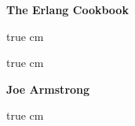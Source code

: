 \begin{titlepage}
\begin{center}
\vspace*{1.0cm}
{\Huge\bf 
The Erlang Cookbook\\
}

 true cm


 true cm

{\large\bf 
Joe Armstrong\\
}

 true cm

\end{center}
\eject
\end{titlepage}

